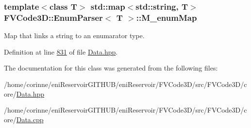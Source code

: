 \subsubsection[{\texorpdfstring{M\+\_\+enum\+Map}{M_enumMap}}]{\setlength{\rightskip}{0pt plus 5cm}template$<$class T$>$ std\+::map$<$std\+::string, T$>$ {\bf F\+V\+Code3\+D\+::\+Enum\+Parser}$<$ T $>$\+::M\+\_\+enum\+Map\hspace{0.3cm}{\ttfamily [private]}}\hypertarget{classFVCode3D_1_1EnumParser_ac993705140577f6454bb873cb3d89b1b}{}\label{classFVCode3D_1_1EnumParser_ac993705140577f6454bb873cb3d89b1b}


Map that links a string to an enumarator type. 



Definition at line \hyperlink{Data_8hpp_source_l00831}{831} of file \hyperlink{Data_8hpp_source}{Data.\+hpp}.



The documentation for this class was generated from the following files\+:\begin{DoxyCompactItemize}
\item 
/home/corinne/eni\+Reservoir\+G\+I\+T\+H\+U\+B/eni\+Reservoir/\+F\+V\+Code3\+D/src/\+F\+V\+Code3\+D/core/\hyperlink{Data_8hpp}{Data.\+hpp}\item 
/home/corinne/eni\+Reservoir\+G\+I\+T\+H\+U\+B/eni\+Reservoir/\+F\+V\+Code3\+D/src/\+F\+V\+Code3\+D/core/\hyperlink{Data_8cpp}{Data.\+cpp}\end{DoxyCompactItemize}
